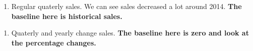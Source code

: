 \documentclass[]{book}
\newenvironment{Shaded}{\begin{snugshade}}{\end{snugshade}}
\newcommand{\KeywordTok}[1]{\textcolor[rgb]{0.13,0.29,0.53}{\textbf{#1}}}
\newcommand{\DataTypeTok}[1]{\textcolor[rgb]{0.13,0.29,0.53}{#1}}
\newcommand{\DecValTok}[1]{\textcolor[rgb]{0.00,0.00,0.81}{#1}}
\newcommand{\FloatTok}[1]{\textcolor[rgb]{0.00,0.00,0.81}{#1}}
\newcommand{\StringTok}[1]{\textcolor[rgb]{0.31,0.60,0.02}{#1}}
\newcommand{\CommentTok}[1]{\textcolor[rgb]{0.56,0.35,0.01}{\textit{#1}}}
\newcommand{\OperatorTok}[1]{\textcolor[rgb]{0.81,0.36,0.00}{\textbf{#1}}}
\newcommand{\NormalTok}[1]{#1}
\providecommand{\tightlist}{%
  \setlength{\itemsep}{0pt}\setlength{\parskip}{0pt}}
\theoremstyle{definition}
\theoremstyle{definition}
\theoremstyle{definition}
\theoremstyle{remark}
\begin{document}
\begin{enumerate}
\def\labelenumi{\arabic{enumi}.}
\tightlist
\item
  Regular quaterly sales. We can see sales decreased a lot around 2014.
  \textbf{The baseline here is historical sales.}
\end{enumerate}

\begin{Shaded}
\end{Shaded}

\begin{enumerate}
\def\labelenumi{\arabic{enumi}.}
\setcounter{enumi}{1}
\tightlist
\item
  Quaterly and yearly change sales. \textbf{The baseline here is zero
  and look at the percentage changes.}
\end{enumerate}
\end{document}
